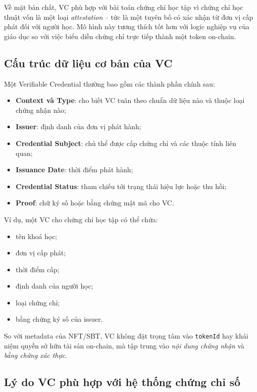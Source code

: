 Về mặt bản chất, VC phù hợp với bài toán chứng chỉ học tập vì chứng chỉ học thuật vốn là một loại \textit{attestation} -- tức là một tuyên bố có xác nhận từ đơn vị cấp phát đối với người học. Mô hình này tương thích tốt hơn với logic nghiệp vụ của giáo dục so với việc biểu diễn chứng chỉ trực tiếp thành một token on-chain.

\subsection{Cấu trúc dữ liệu cơ bản của VC}

Một Verifiable Credential thường bao gồm các thành phần chính sau:
\begin{itemize}
    \item \textbf{Context và Type}: cho biết VC tuân theo chuẩn dữ liệu nào và thuộc loại chứng nhận nào;
    \item \textbf{Issuer}: định danh của đơn vị phát hành;
    \item \textbf{Credential Subject}: chủ thể được cấp chứng chỉ và các thuộc tính liên quan;
    \item \textbf{Issuance Date}: thời điểm phát hành;
    \item \textbf{Credential Status}: tham chiếu tới trạng thái hiệu lực hoặc thu hồi;
    \item \textbf{Proof}: chữ ký số hoặc bằng chứng mật mã cho VC.
\end{itemize}

Ví dụ, một VC cho chứng chỉ học tập có thể chứa:
\begin{itemize}
    \item tên khoá học;
    \item đơn vị cấp phát;
    \item thời điểm cấp;
    \item định danh của người học;
    \item loại chứng chỉ;
    \item bằng chứng ký số của issuer.
\end{itemize}

So với metadata của NFT/SBT, VC không đặt trọng tâm vào \texttt{tokenId} hay khái niệm quyền sở hữu tài sản on-chain, mà tập trung vào \textit{nội dung chứng nhận} và \textit{bằng chứng xác thực}.

\subsection{Lý do VC phù hợp với hệ thống chứng chỉ số}

